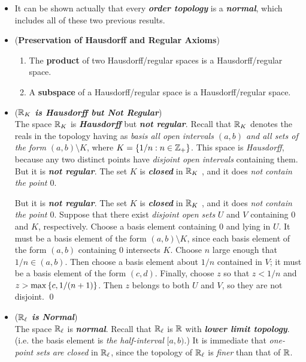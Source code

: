 \documentclass[11pt]{article}
\begin{document}
\begin{itemize}
\item \begin{remark}
It can be shown actually that every \textbf{\emph{order topology}} is a \textbf{\emph{normal}}, which includes all of these two previous results.
\end{remark}


\item 
\begin{proposition} 
(\textbf{Preservation of Hausdorff and Regular Axioms})
\begin{enumerate}
\item The \textbf{product} of two Hausdorff/regular spaces is a Hausdorff/regular space. 
\item A \textbf{subspace} of a Hausdorff/regular space is a Hausdorff/regular space.
\end{enumerate}
\end{proposition}

\item \begin{example} (\emph{\textbf{${\mathbb R}_{K}$ is Hausdorff but Not Regular}})\\
The space ${\mathbb R}_K$ is \emph{\textbf{Hausdorff}} but \emph{\textbf{not regular}}. Recall that ${\mathbb R}_K$ denotes the reals
in the topology having as \emph{basis all open intervals $(a, b)$ and all sets of the form $(a, b) \setminus K$},
where $K = \left\{1/n: n \in {\mathbb Z}_{+}\right\}$. This space is \emph{Hausdorff}, because any two distinct points have
\emph{disjoint open intervals} containing them. But it is \emph{\textbf{not regular}}. The set $K$ is \emph{\textbf{closed}} in ${\mathbb R}_K$ , and it does \emph{not contain the point $0$}. 

But it is \emph{\textbf{not regular}}. The set $K$ is \emph{\textbf{closed}} in ${\mathbb R}_K$ , and it does \emph{not contain the point $0$}.
Suppose that there exist \emph{disjoint open sets} $U$ and $V$ containing $0$ and $K$, respectively.
Choose a basis element containing $0$ and lying in $U$. It must be a basis element of the form $(a, b) \setminus K$, since each basis element of the form $(a, b)$ containing $0$ intersects $K$. Choose $n$ large enough that $1/n \in (a, b)$. Then choose a basis element about $1/n$ contained in $V$;
it must be a basis element of the form $(c, d)$. Finally, choose $z$ so that $z < 1/n$ and $z > \max\left\{c, 1/(n + 1)\right\}$. Then $z$ belongs to both $U$ and $V$, so they are not disjoint. \qed
\end{example}

\item \begin{example}(\emph{\textbf{${\mathbb R}_{\ell}$ is Normal}})\\
The space ${\mathbb R}_{\ell}$ is \emph{\textbf{normal}}. Recall that ${\mathbb R}_{\ell}$ is ${\mathbb R}$ with \emph{\textbf{lower limit topology}}. (i.e. the basis element is \emph{the half-interval} $[a, b)$.) It is immediate that \emph{one-point sets are closed} in ${\mathbb R}_{\ell}$, since the topology of ${\mathbb R}_{\ell}$ is \emph{finer} than that of ${\mathbb R}$. 


\end{example}
\end{itemize}
\end{document}
